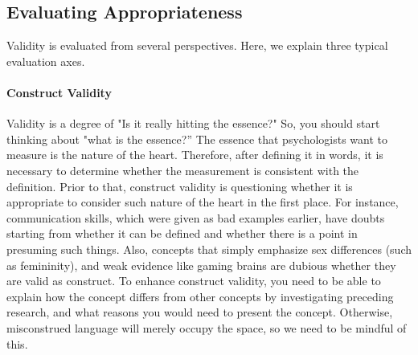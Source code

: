 \documentclass{ltjbook}
\begin{document}
\subsection{Evaluating Appropriateness}
Validity is evaluated from several perspectives. Here, we explain three typical evaluation axes.
\paragraph{Construct Validity} Validity is a degree of "Is it really hitting the essence?" So, you should start thinking about "what is the essence?” The essence that psychologists want to measure is the nature of the heart. Therefore, after defining it in words, it is necessary to determine whether the measurement is consistent with the definition. Prior to that, construct validity is questioning whether it is appropriate to consider such nature of the heart in the first place. For instance, communication skills, which were given as bad examples earlier, have doubts starting from whether it can be defined and whether there is a point in presuming such things. Also, concepts that simply emphasize sex differences (such as femininity), and weak evidence like gaming brains are dubious whether they are valid as construct. To enhance construct validity, you need to be able to explain how the concept differs from other concepts by investigating preceding research, and what reasons you would need to present the concept. Otherwise, misconstrued language will merely occupy the space, so we need to be mindful of this.
\end{document}
